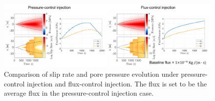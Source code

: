 \begin{figure}[htbp]
    \centering
    \includegraphics[width=1.0\textwidth]{figures/FluxControl.pdf}
    \caption{Comparison of slip rate and pore pressure evolution under pressure-control injection and flux-control injection. 
    The flux is set to be the average flux in the pressure-control injection case.}
    \label{fig:FluxControl}
\end{figure}
